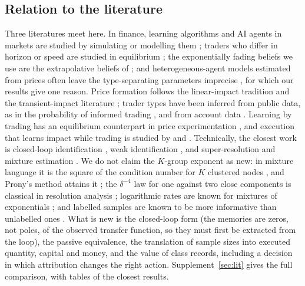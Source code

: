\subsection{Relation to the literature}\label{sec:litmain}
Three literatures meet here. In finance, learning algorithms and AI agents in markets are studied by simulating or modelling them \citep{colliard2022,dou2025}; traders who differ in horizon or speed are studied in equilibrium \citep{cespa2015,biais2015,crouzet2020}; the exponentially fading beliefs we use are the extrapolative beliefs of \citet{barberis2015,barberis2018}; and heterogeneous-agent models estimated from prices often leave the type-separating parameters imprecise \citep{brock1998,amilon2008,kukacka2017}, for which our results give one reason. Price formation follows the linear-impact tradition \citep{kyle1985,glosten1985,hasbrouck1991} and the transient-impact literature \citep{obizhaeva2013,gatheral2010,alfonsi2012}; trader types have been inferred from public data, as in the probability of informed trading \citep{easley1996}, and from account data \citep{kirilenko2017}. Learning by trading has an equilibrium counterpart in price experimentation \citep{leach1993}, and execution that learns impact while trading is studied by \citet{moallemi2008} and \citet{parkvanroy2015}. Technically, the closest work is closed-loop identification \citep{ljung1999,forssell1999}, weak identification \citep{andrews2012}, and super-resolution and mixture estimation \citep{moitra2015,heinrich2018,wu2020,batenkov2021,katz2023}. We do not claim the $K$-group exponent as new: in mixture language it is the square of the condition number for $K$ clustered nodes \citep{heinrich2018,wu2020}, and Prony's method attains it \citep{katz2023}; the $\delta^{-4}$ law for one against two close components is classical in resolution analysis \citep{shahram2005}; logarithmic rates are known for mixtures of exponentials \citep{rebafka2015}; and labelled samples are known to be more informative than unlabelled ones \citep{castelli1996}. What is new is the closed-loop form (the memories are zeros, not poles, of the observed transfer function, so they must first be extracted from the loop), the passive equivalence, the translation of sample sizes into executed quantity, capital and money, and the value of class records, including a decision in which attribution changes the right action. Supplement~\ref{sec:lit} gives the full comparison, with tables of the closest results.

